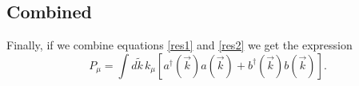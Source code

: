 \subsection*{Combined}
Finally, if we combine equations \ref{res1} and \ref{res2} we get
the expression
\begin{equation}
    P_\mu=  \int d\tilde{k} \,  k_\mu \left[ 
      a^\dagger(\vec{k})a(\vec{k}) +   b^\dagger(\vec{k})b(\vec{k}) 
    \right] .
\end{equation}

